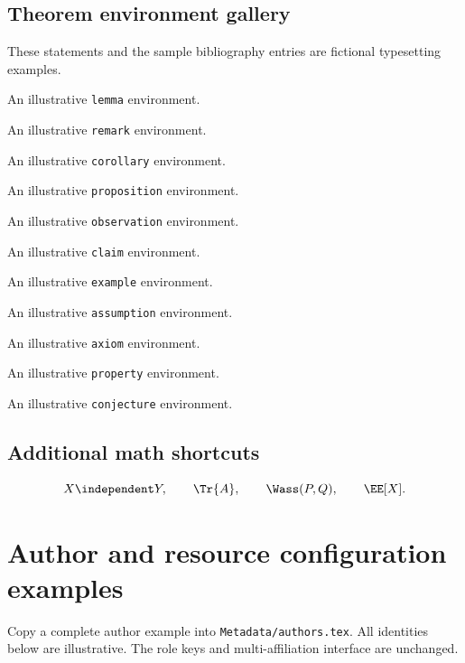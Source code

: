 \subsection{Theorem environment gallery}
These statements and the sample bibliography entries are fictional typesetting examples.
\begin{lemma}An illustrative \texttt{lemma} environment.\end{lemma}
\begin{remark}An illustrative \texttt{remark} environment.\end{remark}
\begin{corollary}An illustrative \texttt{corollary} environment.\end{corollary}
\begin{proposition}An illustrative \texttt{proposition} environment.\end{proposition}
\begin{observation}An illustrative \texttt{observation} environment.\end{observation}
\begin{claim}An illustrative \texttt{claim} environment.\end{claim}
\begin{example}An illustrative \texttt{example} environment.\end{example}
\begin{assumption}An illustrative \texttt{assumption} environment.\end{assumption}
\begin{axiom}An illustrative \texttt{axiom} environment.\end{axiom}
\begin{property}An illustrative \texttt{property} environment.\end{property}
\begin{conjecture}An illustrative \texttt{conjecture} environment.\end{conjecture}

\subsection{Additional math shortcuts}
\[X\independent Y,\qquad\Tr{A},\qquad\Wass(P,Q),\qquad\EE[X].\]

\section{Author and resource configuration examples}
\label{app:metadataexamples}
Copy a complete author example into \verb+Metadata/authors.tex+. All identities below are illustrative. The role keys and multi-affiliation interface are unchanged.

